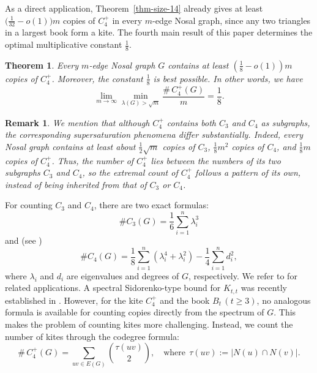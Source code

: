 \documentclass[10pt,a4paper]{amsart}
\newtheorem{theorem}{Theorem}[section]
\newtheorem{remark}{Remark}
\renewcommand{\ge}{\geqslant}
\begin{document}
\smallskip 

As a direct application, Theorem~\ref{thm-size-14} already gives at least
$\big(\frac{1}{32}-o(1) \big)m$ copies of $C_4^+$ in every $m$-edge Nosal graph, since any two triangles in a largest
book form a kite. 
The fourth main result of this paper determines the 
optimal multiplicative constant $\tfrac18$.  

\begin{theorem} \label{thm-C4+}
Every $m$-edge Nosal graph $G$ contains at least 
$\left( \frac{1}{8} - o(1)\right) m$ copies of $C_4^+$. Moreover, the constant $\frac{1}{8}$ is best possible. In other words, we have 
\[  \lim\limits_{m \to \infty} \min_{\lambda (G)> \sqrt{m}} \frac{\texttt{\#}\,C_4^+(G)}{m} = \frac{1}{8}.  \]
\end{theorem}

\begin{remark}
We mention that although $C_4^+$ contains both $C_3$ and $C_4$ as subgraphs, 
the corresponding supersaturation phenomena differ substantially. 
Indeed, every Nosal graph contains at least about $\frac{1}{2}\sqrt{m}$ copies of $C_3$, 
$\frac{1}{8} m^2$ copies of $C_4$, and $\frac{1}{8}m$ copies of $C_4^+$. 
Thus, the number of $C_4^+$ lies between the numbers of its two subgraphs $C_3$ and $C_4$, so the extremal count of $C_4^+$ follows a pattern of its own, instead of being inherited  from that of $C_3$ or $C_4$. 
\end{remark}

\smallskip
For counting $C_3$ and $C_4$, there are two exact formulas: 
$$\texttt{\#}C_3(G)=\frac{1}{6} \sum_{i=1}^n \lambda_i^3$$ 
and (see \cite{LL2009DM}) 
$$\texttt{\#}C_4(G) = \frac{1}{8} \sum_{i=1}^n (\lambda_i^4 + \lambda_i^2) - \frac{1}{4} \sum_{i=1}^n d_i^2,$$
 where $\lambda_i$ and $d_i$ are eigenvalues and degrees of $G$, respectively. We refer to \cite{LNW2021, NingZhai2023, NZ2021b,LiLiuZhang26} for related  applications. 
A spectral Sidorenko-type bound for $K_{t,t}$ was recently established in \cite{LLLZ2026}. 
However, for the kite $C_4^+$ and the book $B_t\, (t\ge 3)$, no analogous formula is available for counting copies directly from the spectrum of $G$. 
This makes the problem of counting kites more challenging. 
Instead, we count the number of kites through the codegree formula: 
$$\texttt{\#}\,C_4^+(G)=\sum_{uv\in E(G)}\binom{\tau(uv)}{2}, \quad \text{where}~~\tau(uv):=|N(u)\cap N(v)|. $$ 
\end{document}
